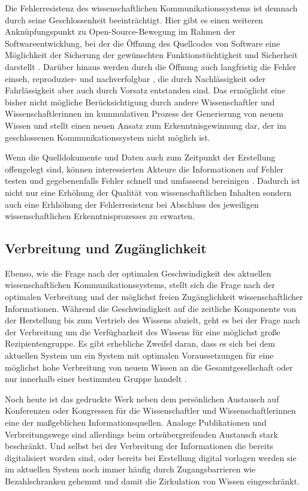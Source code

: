 Die Fehlerresistenz des wissenschaftlichen Kommunikationssystems ist demnach durch seine Geschlossenheit beeinträchtigt. Hier gibt es einen weiteren Anknüpfungspunkt zu Open-Source-Bewegung im Rahmen der Softwareentwicklung, bei der die Öffnung des Quellcodes von Software eine Möglichkeit der Sicherung der gewünschten Funktionstüchtigkeit und Sicherheit darstellt \cite[:7]{Hoepman_2007}. Darüber hinaus werden durch die Öffnung auch langfristig die Fehler einseh, reproduzier- und nachverfolgbar \cite{Nosek_2015}, die durch Nachlässigkeit oder Fahrlässigkeit aber auch durch Vorsatz entstanden sind. Das ermöglicht eine bisher nicht mögliche Berücksichtigung durch andere Wissenschaftler und Wissenschaftlerinnen im kummulativen Prozess der Generierung von neuem Wissen und stellt einen neuen Ansatz zum Erkenntnisgewinnung dar, der im geschlossenen Kommunikationssystem nicht möglich ist.

Wenn die Quelldokumente und Daten auch zum Zeitpunkt der Erstellung offengelegt sind, können interessierten Akteure die Informationen auf Fehler testen und gegebenenfalls Fehler schnell und umfassend bereinigen \cite[:10]{Gruber_2005} \cite{Curry_2015}. Dadurch ist nicht nur eine Erhöhung der Qualität von wissenschaftlichen Inhalten sondern auch eine Erhhöhung der Fehlerresistenz bei Abschluss des jeweiligen wissenschaftlichen Erkenntnisprozesses zu erwarten.

\subsection{Verbreitung und Zugänglichkeit}

Ebenso, wie die Frage nach der optimalen Geschwindigkeit des aktuellen wissenschaftlichen Kommunikationssystems, stellt sich die Frage nach der optimalen Verbreitung und der möglichst freien Zugänglichkeit \cite[:10]{Gruber_2005} wissenschaftlicher Informationen. Während die Geschwindigkeit auf die zeitliche Komponente von der Herstellung bis zum Vertrieb des Wissens abzielt, geht es bei der Frage nach der Verbreitung um die Verfügbarkeit des Wissens für eine möglichst große Rezipientengruppe. Es gibt erhebliche Zweifel daran, dass es sich bei dem aktuellen System um ein System mit optimalen Voraussetzungen für eine möglichst hohe Verbreitung von neuem Wissen an die Gesamtgesellschaft \cite{Curry_2015} oder nur innerhalb einer bestimmten Gruppe handelt .

Noch heute ist das gedruckte Werk neben dem persönlichen Austausch auf Konferenzen oder Kongressen \cite{Winkler_2011} für die Wissenschaftler und Wissenschaftlerinnen eine der maßgeblichen Informationsquellen. Analoge Publikationen und Verbreitungswege sind allerdings beim ortsübergreifenden Austausch stark beschränkt. Und selbst bei der Verbreitung der Informationen die bereits digitalisiert worden sind, oder bereits bei Erstellung digital vorlagen werden sie im aktuellen System noch immer häufig durch Zugangsbarrieren wie Bezahlschranken gehemmt und damit die Zirkulation von Wissen eingeschränkt.

